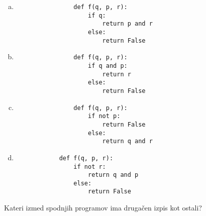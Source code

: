 \documentclass[arhiv, 10pt]{../izpit}
\begin{document}
        \begin{multicols}{2}
        \begin{enumerate}[(a)]
\item 
                \begin{verbatim}
                def f(q, p, r):
                    if q:
                        return p and r
                    else:
                        return False
                \end{verbatim}
            
\item 
                \begin{verbatim}
                def f(q, p, r):
                    if q and p:
                        return r
                    else:
                        return False
                \end{verbatim}
            
\item 
                \begin{verbatim}
                def f(q, p, r):
                    if not p:
                        return False
                    else:
                        return q and r
                \end{verbatim}
            
\item 
            \begin{verbatim}
            def f(q, p, r):
                if not r:
                    return q and p
                else:
                    return False
            \end{verbatim}
        
\end{enumerate}

        \end{multicols}
    
        \naloga*
        
        Kateri izmed spodnjih programov ima drugačen izpis kot ostali?
    
\end{document}

